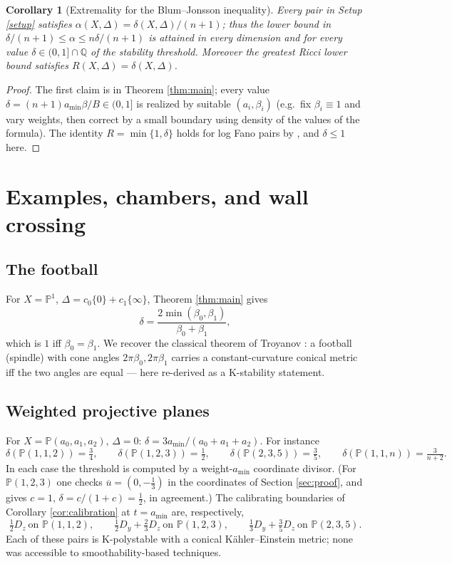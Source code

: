 \documentclass[11pt]{amsart}
\newtheorem{corollary}[theorem]{Corollary}
\theoremstyle{definition}
\theoremstyle{remark}
\newcommand{\Q}{\mathbb{Q}}
\newcommand{\PP}{\mathbb{P}}
\newcommand{\bary}{\overline{u}}
\begin{document}
\begin{corollary}[Extremality for the Blum--Jonsson inequality]
\label{cor:alpha}
Every pair in Setup \textup{\ref{setup}} satisfies
\(\alpha(X,\Delta)=\delta(X,\Delta)/(n+1)\); thus the lower bound in
\(\delta/(n+1)\le\alpha\le n\delta/(n+1)\) is attained in every dimension
and for every value \(\delta\in(0,1]\cap\Q\) of the stability threshold.
Moreover the greatest Ricci lower bound satisfies
\(R(X,\Delta)=\delta(X,\Delta)\).
\end{corollary}

\begin{proof}
The first claim is in Theorem \ref{thm:main}; every value
\(\delta=(n+1)a_{\min}\beta/B\in(0,1]\) is realized by suitable
\((a_i,\beta_i)\) (e.g.\ fix \(\beta_i\equiv1\) and vary weights, then
correct by a small boundary using density of the values of the formula).
The identity \(R=\min\{1,\delta\}\) holds for log Fano pairs by
\cite{CRZ19,BBJ21}, and \(\delta\le1\) here.
\end{proof}

\section{Examples, chambers, and wall crossing}\label{sec:examples}

\subsection{The football}\label{ss:football}
For \(X=\PP^1\), \(\Delta=c_0\{0\}+c_1\{\infty\}\), Theorem
\ref{thm:main} gives
\[
\delta = \frac{2\min(\beta_0,\beta_1)}{\beta_0+\beta_1},
\]
which is \(1\) iff \(\beta_0=\beta_1\). We recover the classical theorem of
Troyanov \cite{Tro91}: a football (spindle) with cone angles
\(2\pi\beta_0,2\pi\beta_1\) carries a constant-curvature conical metric
iff the two angles are equal --- here re-derived as a K-stability
statement.

\subsection{Weighted projective planes}\label{ss:wpp}
For \(X=\PP(a_0,a_1,a_2)\), \(\Delta=0\):
\(\delta = 3a_{\min}/(a_0+a_1+a_2)\). For instance
\[
\delta(\PP(1,1,2))=\tfrac34,\qquad
\delta(\PP(1,2,3))=\tfrac12,\qquad
\delta(\PP(2,3,5))=\tfrac35,\qquad
\delta(\PP(1,1,n))=\tfrac{3}{n+2}.
\]
In each case the threshold is computed by a weight-\(a_{\min}\)
coordinate divisor. (For \(\PP(1,2,3)\) one checks
\(\bary=(0,-\tfrac13)\) in the coordinates of Section \ref{sec:proof},
and \cite[Corollary 7.19]{BJ20} gives \(c=1\), \(\delta=c/(1+c)=\tfrac12\),
in agreement.) The calibrating boundaries of Corollary
\ref{cor:calibration} at \(t=a_{\min}\) are, respectively,
\[
\tfrac12D_z \ \text{on } \PP(1,1,2),\qquad
\tfrac12D_y+\tfrac23D_z \ \text{on } \PP(1,2,3),\qquad
\tfrac13D_y+\tfrac35D_z \ \text{on } \PP(2,3,5).
\]
Each of these pairs is K-polystable with a conical K\"ahler--Einstein
metric; none was accessible to smoothability-based techniques.
\end{document}
